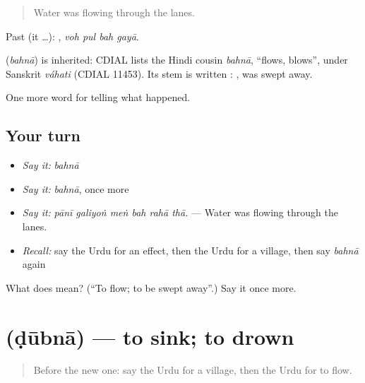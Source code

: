 \begin{quote}
Water was flowing through the lanes.
\end{quote}

Past (it …):    , \emph{voh pul bah gayā}.

\begin{cousinweb}
\textbf{} (\emph{bahnā}) is inherited: CDIAL lists the Hindi cousin \emph{bahnā}, \textquotedblleft{}flows, blows\textquotedblright{}, under Sanskrit \emph{váhati} (CDIAL 11453). Its stem is written \textbf{}: \textbf{ }, was swept away.
\end{cousinweb}

\begin{grammarlens}[title={What you've built}]
One more word for telling what happened.
\end{grammarlens}

\subsection*{Your turn}
\begin{itemize}
\raggedright
  \item \emph{Say it:} \emph{bahnā}
  \item \emph{Say it:} \emph{bahnā}, once more
  \item \emph{Say it:} \emph{pānī galiyoṅ meṅ bah rahā thā.} — Water was flowing through the lanes.
  \item \emph{Recall:} say the Urdu for an effect, then the Urdu for a village, then say \emph{bahnā} again
\end{itemize}

\begin{tcolorbox}[breakable,colback=teal!4,colframe=teal!35!black,title={Before you move on}]
What does  mean? (\textquotedblleft{}To flow; to be swept away\textquotedblright{}.) Say it once more.
\end{tcolorbox}
\section[\texorpdfstring{\ur{ڈوبنا} (ḍūbnā)}{ڈوبنا (ḍūbnā)}]{ (ḍūbnā) — to sink; to drown}

\label{lesson:UR-C293-dubna}



\begin{quote}
Before the new one: say the Urdu for a village, then the Urdu for to flow.
\end{quote}

